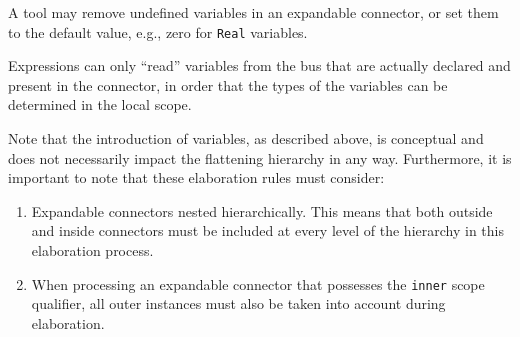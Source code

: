 \begin{nonnormative}
A tool may remove undefined variables in an expandable connector, or set them to the default value, e.g., zero for \lstinline!Real! variables.
\end{nonnormative}

\begin{nonnormative}
Expressions can only ``read'' variables from the bus that are actually declared and present in the connector, in order that the types of the variables can be determined in the local scope.
\end{nonnormative}

\begin{nonnormative}
Note that the introduction of variables, as described above, is conceptual and does not necessarily impact the flattening hierarchy in any way.
Furthermore, it is important to note that these elaboration rules must consider:
\begin{enumerate}
\item
  Expandable connectors nested hierarchically.
  This means that  both outside and inside connectors must be included at every level of the hierarchy in this elaboration process.
\item
  When processing an expandable connector that possesses the \lstinline!inner! scope qualifier, all outer instances must also be taken into account during elaboration.
\end{enumerate}
\end{nonnormative}

